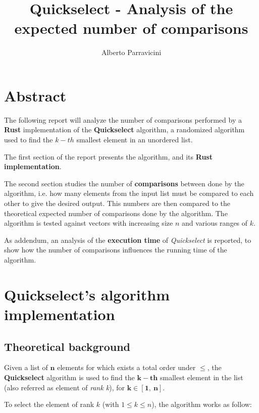 \documentclass[
12pt,
a4paper,
oneside,
headinclude,
footinclude]{article}
\title{\textbf{Quickselect - Analysis of the expected number of comparisons}}
\author{{Alberto Parravicini}}
\date{}	%
\begin{document}
\maketitle
{}
\setcounter{page}{1}

\section{Abstract}
The following report will analyze the number of comparisons performed by a \textbf{Rust} implementation of the \textbf{Quickselect} algorithm, a randomized algorithm used to find the $k-th$ smallest element in an unordered list.

The first section of the report presents the algorithm, and its \textbf{Rust implementation}.

The second section studies the number of \textbf{comparisons} between done by the algorithm,
i.e. how many elements from the input list must be compared to each other to give the desired output.
This numbers are then compared to the theoretical expected number of comparisons done by the algorithm.\newline
The algorithm is tested against vectors with increasing size $n$ and various ranges of $k$.

As addendum, an analysis of the \textbf{execution time} of \textit{Quickselect} is reported, to show how the number of comparisons influences the running time of the algorithm.

\section{Quickselect's algorithm implementation}
\vspace{-5mm}
\subsection{Theoretical background}
\vspace{-5mm}
Given a list of $\mathbf{n}$ elements for which exists a total order under $\mathbf{\leq}$, the \textbf{Quickselect} algorithm is used to find the $\mathbf{k-th}$ smallest element in the list (also referred as element of \textit{rank k}), for $\mathbf{k \in [1,\ n]}$.

\newpage
To select the element of rank $k$ (with $1 \leq k \leq n$), the algorithm works as follow:
\end{document}
